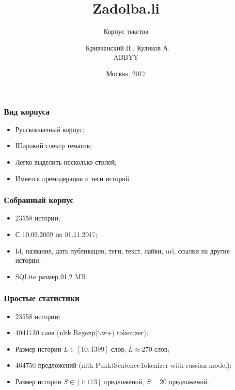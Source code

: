 \documentclass[14pt]{beamer}
\title{Zadolba.li}
\subtitle{\footnotesize{Корпус текстов}}
\author{\small{%
		~Кривчанский Н., Куликов А.}\\%
	\vspace{30pt}%
	ABBYY%
	\vspace{20pt}%
}
\date{\small{Москва, 2017}}
\begin{document}
	
	\maketitle

\begin{frame}[fragile]
	
	\frametitle{Вид корпуса}
	
	\begin{itemize}
		\item Русскоязычный корпус;
		\item Широкий спектр тематик;
		\item Легко выделить несколько стилей;
		\item Имеется премодерация и теги историй.
	\end{itemize}

\end{frame}

\begin{frame}[fragile]
	
	\frametitle{Собранный корпус}
	
	\begin{itemize}
		\item 23558 истории;
		\item С 10.09.2009 по 01.11.2017;
		\item Id, название, дата публикации, теги, текст, лайки, url, ссылки на другие истории;
		\item SQLite размер 91,2 MB.
	\end{itemize}
	
\end{frame}

\begin{frame}[fragile]
	
	\frametitle{Простые статистики}
	
	\begin{itemize}
		\item 23558 истории;
		\item 4041730 слов (nltk Regexp($\backslash$w+) tokenizer);
		\item Размер истории $L \in [10; 1399]$ слов, $\bar L \approx 270$ слов;
		\item 464750 предложений (nltk PunktSentenceTokenizer with russian model);
		\item Размер истории $S \in [1; 173]$ предложений, $\bar S = 20$ предложений.
	\end{itemize}
	
\end{frame}
\end{document}
